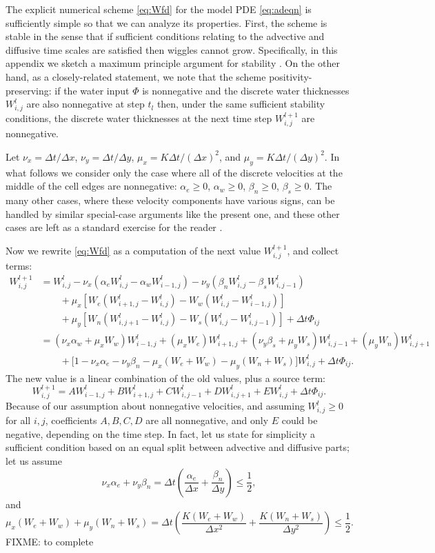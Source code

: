 \documentclass[12pt,final]{amsart}%
\newcommand{\Wlij}{W^l_{i,j}}
\begin{document}
The explicit numerical scheme \eqref{eq:Wfd} for the model PDE \eqref{eq:adeqn} is sufficiently simple so that we can analyze its properties.  First, the scheme is stable in the sense that if sufficient conditions relating to the advective and diffusive time scales are satisfied then wiggles cannot grow.  Specifically, in this appendix we sketch a maximum principle argument for stability \citep{MortonMayers}.  On the other hand, as a closely-related statement, we note that the scheme positivity-preserving: if the water input $\Phi$ is nonnegative and the discrete water thicknesses $\Wlij$ are also nonnegative at step $t_l$ then, under the same sufficient stability conditions, the discrete water thicknesses at the next time step $W_{i,j}^{l+1}$ are nonnegative.

Let $\nu_x = \Delta t/\Delta x$, $\nu_y = \Delta t/\Delta y$, $\mu_x = K \Delta t / (\Delta x)^2$, and $\mu_y = K \Delta t / (\Delta y)^2$.  In what follows we consider only the case where all of the discrete velocities at the middle of the cell edges are nonnegative: $\alpha_e\ge 0$, $\alpha_w\ge 0$, $\beta_n\ge 0$, $\beta_s\ge 0$.  The many other cases, where these velocity components have various signs, can be handled by similar special-case arguments like the present one, and these other cases are left as a standard exercise for the reader \citep{MortonMayers}.

Now we rewrite \eqref{eq:Wfd} as a computation of the next value $W_{i,j}^{l+1}$, and collect terms:
\begin{align*}
 W_{i,j}^{l+1} &= \Wlij - \nu_x \left(\alpha_e \Wlij - \alpha_w W_{i-1,j}^l\right) - \nu_y \left(\beta_n \Wlij - \beta_s W_{i,j-1}^l\right)  \\
      &\qquad + \mu_x \left[W_e \left(W_{i+1,j}^l - \Wlij\right) - W_w \left(\Wlij - W_{i-1,j}^l\right)\right]  \\
      &\qquad + \mu_y \left[W_n \left(W_{i,j+1}^l - \Wlij\right) - W_s \left(\Wlij - W_{i,j-1}^l\right)\right] + \Delta t \Phi_{ij} \\
      &= (\nu_x \alpha_w + \mu_x W_w) W_{i-1,j}^l + (\mu_x W_e) W_{i+1,j}^l + (\nu_y \beta_s + \mu_y W_s) W_{i,j-1}^l + (\mu_y W_n) W_{i,j+1}^l \\
      &\qquad + \Big[1 - \nu_x \alpha_e - \nu_y \beta_n - \mu_x (W_e + W_w) - \mu_y (W_n + W_s)\Big] \Wlij + \Delta t \Phi_{ij}.
\end{align*}
The new value is a linear combination of the old values, plus a source term:
   $$W_{i,j}^{l+1} = A W_{i-1,j}^l + B W_{i+1,j}^l + C W_{i,j-1}^l + D W_{i,j+1}^l + E \Wlij + \Delta t \Phi_{ij}.$$
Because of our assumption about nonnegative velocities, and assuming $\Wlij \ge 0$ for all $i,j$, coefficients $A,B,C,D$ are all nonnegative, and only $E$ could be negative, depending on the time step.  In fact, let us state for simplicity a sufficient condition based on an equal split between advective and diffusive parts; let us assume
	$$\nu_x \alpha_e + \nu_y \beta_n = \Delta t \left(\frac{\alpha_e}{\Delta x} + \frac{\beta_n}{\Delta y}\right) \le \frac{1}{2},$$
and
    $$\mu_x (W_e + W_w) + \mu_y (W_n + W_s) = \Delta t \left(\frac{K(W_e + W_w)}{\Delta x^2} + \frac{K(W_n + W_s)}{\Delta y^2}\right) \le \frac{1}{2}.$$
FIXME: to complete
\end{document}
